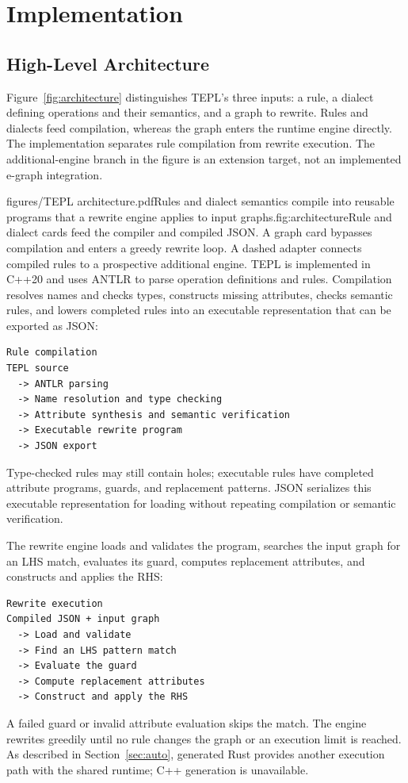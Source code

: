 \FloatBarrier
\section{Implementation}
\label{sec:implementation}
\FloatBarrier
\subsection{High-Level Architecture}
Figure~\ref{fig:architecture} distinguishes TEPL's three inputs: a rule,
a dialect defining operations and their semantics, and a graph to rewrite.
Rules and dialects feed compilation, whereas the graph enters the runtime
engine directly. The implementation separates rule compilation from rewrite
execution. The additional-engine branch in the figure is an extension target,
not an implemented e-graph integration.


\begin{figuretext}{figures/TEPL architecture.pdf}{Rules and dialect semantics compile into reusable programs that a rewrite engine applies to input graphs.}{fig:architecture}{Rule and dialect cards feed the compiler and compiled JSON. A graph card
bypasses compilation and enters a greedy rewrite loop. A dashed adapter
connects compiled rules to a prospective additional engine.}
TEPL is implemented in C++20 and uses ANTLR to parse operation definitions
and rules. Compilation resolves names and checks types, constructs missing
attributes, checks semantic rules, and lowers completed rules into an
executable representation that can be exported as JSON:
\begin{codeblock}[H]
\begin{lstlisting}
Rule compilation
TEPL source
  -> ANTLR parsing
  -> Name resolution and type checking
  -> Attribute synthesis and semantic verification
  -> Executable rewrite program
  -> JSON export
\end{lstlisting}
\end{codeblock}
Type-checked rules may still contain holes; executable rules have completed
attribute programs, guards, and replacement patterns. JSON serializes this
executable representation for loading without repeating compilation or
semantic verification.

The rewrite engine loads and validates the program, searches the input graph
for an LHS match, evaluates its guard, computes replacement attributes, and
constructs and applies the RHS:
\end{figuretext}

\begin{codeblock}[H]
\begin{lstlisting}
Rewrite execution
Compiled JSON + input graph
  -> Load and validate
  -> Find an LHS pattern match
  -> Evaluate the guard
  -> Compute replacement attributes
  -> Construct and apply the RHS
\end{lstlisting}
\end{codeblock}
A failed guard or invalid attribute evaluation skips the match. The engine
rewrites greedily until no rule changes the graph or an execution limit is
reached. As described in Section~\ref{sec:auto}, generated Rust provides
another execution path with the shared runtime; C++ generation is unavailable.

